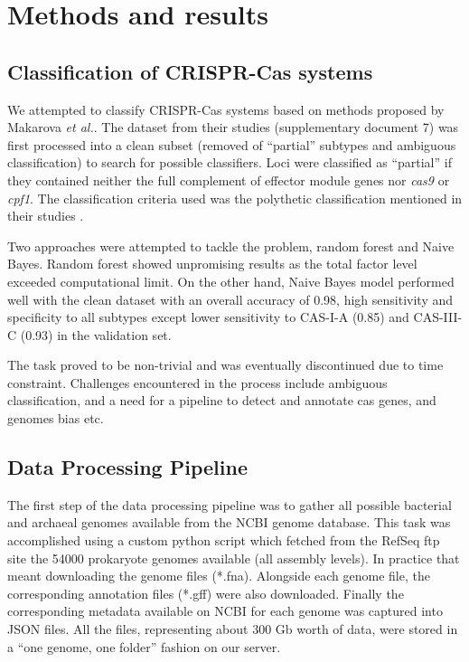 \documentclass[11pt, a4paper,titlepage]{article}
\begin{document}
\section{Methods and results}

\subsection{Classification of CRISPR-Cas systems}
We attempted to classify CRISPR-Cas systems based on methods proposed
by Makarova \emph{et al.}. The dataset from their studies
(supplementary document 7) was first processed into a clean subset
(removed of “partial” subtypes and ambiguous classification) to search
for possible classifiers. Loci were classified as “partial” if they
contained neither the full complement of effector module genes nor
\emph{cas9} or \emph{cpf1}. The classification criteria used was the
polythetic classification mentioned in their studies
\cite{makarova2015updated}.

Two approaches were attempted to tackle the problem, random forest and
Naive Bayes. Random forest showed unpromising results as the total
factor level exceeded computational limit. On the other hand, Naive
Bayes model performed well with the clean dataset with an overall
accuracy of 0.98, high sensitivity and specificity to all subtypes
except lower sensitivity to CAS-I-A (0.85) and CAS-III-C (0.93) in the
validation set.

The task proved to be non-trivial and was eventually discontinued due
to time constraint. Challenges encountered in the process include
ambiguous classification, and a need for a pipeline to detect and
annotate cas genes, and genomes bias etc.

\subsection{Data Processing Pipeline}

The first step of the data processing pipeline was to gather all
possible bacterial and archaeal genomes available from the NCBI genome
database. This task was accomplished using a custom python script
which fetched from the RefSeq ftp site \cite{pruitt2007ncbi} the 54000
prokaryote genomes available (all assembly levels). In practice that
meant downloading the genome files (*.fna). Alongside each genome
file, the corresponding annotation files (*.gff) were also
downloaded. Finally the corresponding metadata available on NCBI for
each genome was captured into JSON files. All the files, representing
about 300 Gb worth of data, were stored in a ``one genome, one
folder'' fashion on our server.
\end{document}
